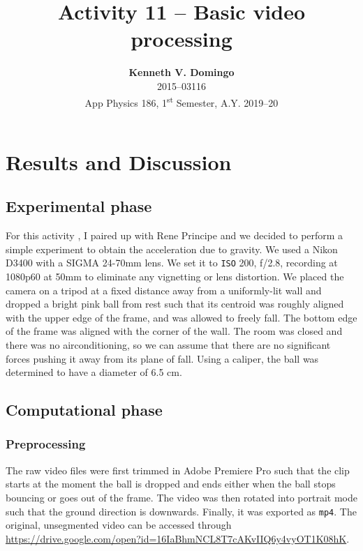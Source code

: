 \documentclass[12pt,a4paper]{article}
\newcommand{\activity}{Activity 11 -- Basic video processing}
\begin{document}
\title{\TitleFont \activity}
\author[ ]{\textbf{Kenneth V. Domingo} \\
2015--03116 \\
App Physics 186, 1\textsuperscript{st} Semester, A.Y. 2019--20}

\maketitle
\thispagestyle{titlestyle}

\section*{Results and Discussion}
\setcounter{section}{1}

\subsection{Experimental phase}
For this activity \cite{soriano}, I paired up with Rene Principe and we decided to perform a simple experiment to obtain the acceleration due to gravity. We used a Nikon D3400 with a SIGMA 24-70mm lens. We set it to \texttt{ISO} 200, f/2.8, recording at 1080p60 at 50mm to eliminate any vignetting or lens distortion. We placed the camera on a tripod at a fixed distance away from a uniformly-lit wall and dropped a bright pink ball from rest such that its centroid was roughly aligned with the upper edge of the frame, and was allowed to freely fall. The bottom edge of the frame was aligned with the corner of the wall. The room was closed and there was no airconditioning, so we can assume that there are no significant forces pushing it away from its plane of fall. Using a caliper, the ball was determined to have a diameter of 6.5 cm.

\subsection{Computational phase}
\subsubsection{Preprocessing}
The raw video files were first trimmed in Adobe Premiere Pro such that the clip starts at the moment the ball is dropped and ends either when the ball stops bouncing or goes out of the frame. The video was then rotated into portrait mode such that the ground direction is downwards. Finally, it was exported as \texttt{mp4}. The original, unsegmented video can be accessed through \\
\url{https://drive.google.com/open?id=16IaBhmNCL8T7cAKvIIQ6y4vyOT1K08hK}.
\end{document}
